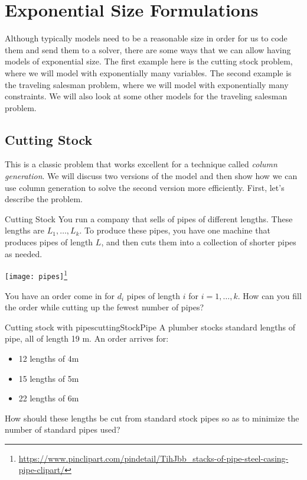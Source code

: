 
%
%

\chapter{Exponential Size Formulations}
\label{sec:exponential-IP-forumulations}

Although typically models need to be a reasonable size in order for us to code them and send them to a solver, there are some ways that we can allow having models of exponential size.  The first example here is the cutting stock problem, where we will model with exponentially many variables.  The second example is the traveling salesman problem, where we will model with exponentially many constraints.  We will also look at some other models for the traveling salesman problem.  
\section{Cutting Stock}
This is a classic problem that works excellent for a technique called \emph{column generation}.
We will discuss two versions of the model and then show how we can use column generation to solve the second version more efficiently.  First, let's describe the problem.

\begin{general}{Cutting Stock}{}
You run a company that sells of pipes of different lengths.  These lengths are $L_1, \dots, L_k$.  To produce these pipes, you have one machine that produces pipes of length $L$, and then cuts them into a collection of shorter pipes as needed.  

\begin{center}
\texttt{[image: pipes]}\footnote{
\url{https://www.pinclipart.com/pindetail/TihJbb_stacks-of-pipe-steel-casing-pipe-clipart/}}
\end{center}

You have an order come in for $d_i$ pipes of length $i$ for $i=1, \dots, k$.  How can you fill the order while cutting up the fewest number of pipes?
\end{general}
\begin{example}{Cutting stock with pipes}{cuttingStockPipe}
A plumber stocks standard lengths of pipe, all of length 19 m. An order arrives for:
\begin{itemize}
\item  12 lengths of 4m
\item 15 lengths of 5m
\item 22 lengths of 6m
\end{itemize}
How should these lengths be cut from standard stock pipes so as to minimize
the number of standard pipes used?
\end{example}
\begin{center}
\end{center}

